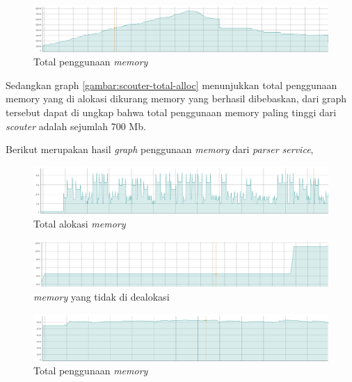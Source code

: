 \begin{figure}[H]
  \centering
  \includegraphics[keepaspectratio, width=15cm]{gambar/graph/scouter-total-usage.png}
  \caption{Total penggunaan \emph{memory}}
  \label{gambar:scouter-total-usage}
\end{figure}

Sedangkan graph \ref{gambar:scouter-total-alloc} menunjukkan total penggunaan memory yang di alokasi dikurang memory yang berhasil dibebaskan, dari graph tersebut dapat di ungkap bahwa total penggunaan memory paling tinggi dari \emph{scouter} adalah sejumlah 700 Mb.

Berikut merupakan hasil \emph{graph} penggunaan \emph{memory} dari \emph{parser service},

\begin{figure}[H]
  \centering
  \includegraphics[keepaspectratio, width=15cm]{gambar/graph/parser-total-alloc.png}
  \caption{Total alokasi \emph{memory}}
  \label{gambar:parser-total-alloc}
\end{figure}

\begin{figure}[H]
  \centering
  \includegraphics[keepaspectratio, width=15cm]{gambar/graph/parser-never-dealloc.png}
  \caption{\emph{memory} yang tidak di dealokasi}
  \label{gambar:parser-never-dealloc}
\end{figure}

\begin{figure}[H]
  \centering
  \includegraphics[keepaspectratio, width=15cm]{gambar/graph/parser-total-usage.png}
  \caption{Total penggunaan \emph{memory}}
  \label{gambar:parser-total-usage}
\end{figure}

